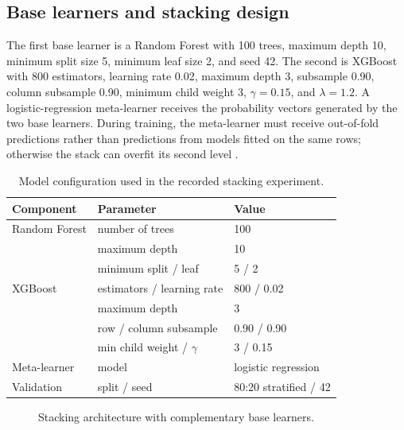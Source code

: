 ﻿\documentclass[preprint,12pt]{elsarticle}
\begin{document}
\subsection{Base learners and stacking design}
The first base learner is a Random Forest with 100 trees, maximum depth 10, minimum split size 5, minimum leaf size 2, and seed 42. The second is XGBoost with 800 estimators, learning rate 0.02, maximum depth 3, subsample 0.90, column subsample 0.90, minimum child weight 3, $\gamma=0.15$, and $\lambda=1.2$. A logistic-regression meta-learner receives the probability vectors generated by the two base learners. During training, the meta-learner must receive out-of-fold predictions rather than predictions from models fitted on the same rows; otherwise the stack can overfit its second level \cite{stackreview2022,ensemble2021}.

\begin{table}[t]
\centering
\caption{Model configuration used in the recorded stacking experiment.}
\label{tab:hyper}
\small
\begin{tabular}{lll}
\toprule
Component & Parameter & Value \\
\midrule
Random Forest & number of trees & 100 \\
 & maximum depth & 10 \\
 & minimum split / leaf & 5 / 2 \\
XGBoost & estimators / learning rate & 800 / 0.02 \\
 & maximum depth & 3 \\
 & row / column subsample & 0.90 / 0.90 \\
 & min child weight / $\gamma$ & 3 / 0.15 \\
Meta-learner & model & logistic regression \\
Validation & split / seed & 80:20 stratified / 42 \\
\bottomrule
\end{tabular}
\end{table}

\begin{figure}[t]
\centering
{}
\caption{Stacking architecture with complementary base learners.}
\label{fig:stack}
\end{figure}
\end{document}
